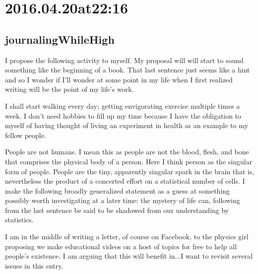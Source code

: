 \section*{ 2016.04.20at22:16 }
\subsection*{journalingWhileHigh}
I propose the following activity to myself. My proposal will will start to sound something like the beginning of a book. That last sentence just seems like a hint and so I wonder if I'll wonder at some point in my life when I first realized writing will be the point of my life's work.

I shall start walking every day; getting envigorating exercise multiple times a week. I don't need hobbies to fill up my time because I have the obligation to myself of having thought of living an experiment in health as an example to my fellow people.

People are not humans. I mean this as people are not the blood, flesh, and bone that comprises the physical body of a person. Here I think person as the singular form of people. People are the tiny, apparently singular spark in the brain that is, nevertheless the product of a concerted effort on a statistical number of cells. I make the following broadly generalized statement as a guess at something possibly worth investigating at a later time: the mystery of life can, following from the last sentence be said to be shadowed from our understanding by statistics.

I am in the middle of writing a letter, of course on Facebook, to the physics girl proposing we make educational videos on a host of topics for free to help all people's existence. I am arguing that this will benefit in...I want to revisit several issues in this entry. 

